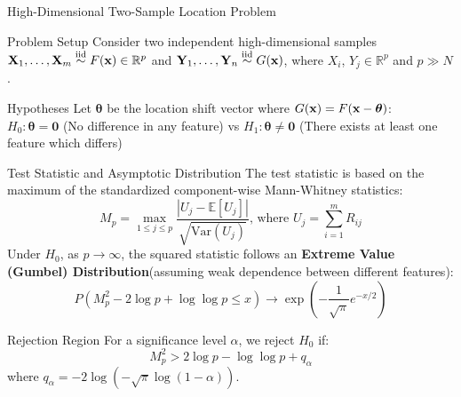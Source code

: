 \documentclass[8pt]{beamer}
\begin{document}

\begin{frame}{High-Dimensional Two-Sample Location Problem}
    \footnotesize
    \begin{block}{Problem Setup}
        Consider two independent high-dimensional samples $\mathbf{X}_1, \dots, \mathbf{X}_m \stackrel{\text{iid}}{\sim} F(\text{\textbf{x}}) \in \mathbb{R}^p$ and $\mathbf{Y}_1, \dots, \mathbf{Y}_n \stackrel{\text{iid}}{\sim} G(\text{\textbf{x}})$, where $X_i$, $Y_j\in \mathbb{R}^p$ and $p \gg N$. 
    \end{block}

    \begin{block}{Hypotheses}
        Let $\boldsymbol{\theta}$ be the location shift vector where $G(\text{\textbf{x}}) = F(\text{\textbf{x}}-\boldsymbol{\theta})$:\\
            $H_0: \boldsymbol{\theta} = \mathbf{0}$ (No difference in any feature) vs 
            $H_1: \boldsymbol{\theta} \neq \mathbf{0}$ (There exists at least one feature which differs)
    \end{block}

    \begin{block}{Test Statistic and Asymptotic Distribution}
        The test statistic is based on the maximum of the standardized component-wise Mann-Whitney statistics:
        $$M_p = \max_{1 \le j \le p} \frac{|U_j - \mathbb{E}[U_j]|}{\sqrt{\text{Var}(U_j)}} \text{, where } U_j = \sum_{i=1}^m R_{ij}$$
        Under $H_0$, as $p \to \infty$, the squared statistic follows an \textbf{Extreme Value (Gumbel) Distribution}(assuming weak dependence between different features):
        $$P(M_p^2 - 2\log p + \log \log p \le x) \to \exp\left(-\frac{1}{\sqrt{\pi}} e^{-x/2}\right)$$
    \end{block}

    \begin{block}{Rejection Region}
        For a significance level $\alpha$, we reject $H_0$ if:
        $$M_p^2 > 2\log p - \log \log p + q_\alpha$$
        where $q_\alpha = -2 \log(-\sqrt{\pi} \log(1-\alpha))$.
    \end{block}
\end{frame}
\end{document}
